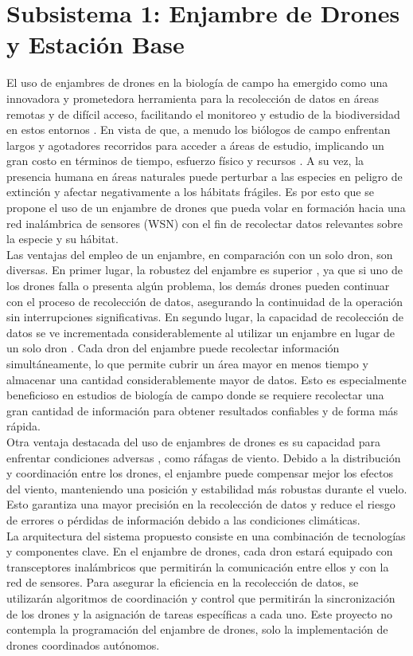 \section{Subsistema 1: Enjambre de Drones y Estación Base}
El uso de enjambres de drones en la biología de campo ha emergido como una innovadora y prometedora herramienta para la recolección de datos en áreas remotas y de difícil acceso, facilitando el monitoreo y estudio de la biodiversidad en estos entornos \cite{23}. En vista de que, a menudo los biólogos de campo enfrentan largos y agotadores recorridos para acceder a áreas de estudio, implicando un gran costo en términos de tiempo, esfuerzo físico y recursos \cite{24}. A su vez, la presencia humana en áreas naturales puede perturbar a las especies en peligro de extinción y afectar negativamente a los hábitats frágiles. Es por esto que se propone el uso de un enjambre de drones que pueda volar en formación hacia una red inalámbrica de sensores (WSN) con el fin de recolectar datos relevantes sobre la especie y su hábitat.\\
Las ventajas del empleo de un enjambre, en comparación con un solo dron, son diversas. En primer lugar, la robustez del enjambre es superior \cite{25}, ya que si uno de los drones falla o presenta algún problema, los demás drones pueden continuar con el proceso de recolección de datos, asegurando la continuidad de la operación sin interrupciones significativas. En segundo lugar, la capacidad de recolección de datos se ve incrementada considerablemente al utilizar un enjambre en lugar de un solo dron \cite{26}. Cada dron del enjambre puede recolectar información simultáneamente, lo que permite cubrir un área mayor en menos tiempo y almacenar una cantidad considerablemente mayor de datos. Esto es especialmente beneficioso en estudios de biología de campo donde se requiere recolectar una gran cantidad de información para obtener resultados confiables y de forma más rápida.\\
Otra ventaja destacada del uso de enjambres de drones es su capacidad para enfrentar condiciones adversas \cite{27}, como ráfagas de viento. Debido a la distribución y coordinación entre los drones, el enjambre puede compensar mejor los efectos del viento, manteniendo una posición y estabilidad más robustas durante el vuelo. Esto garantiza una mayor precisión en la recolección de datos y reduce el riesgo de errores o pérdidas de información debido a las condiciones climáticas.\\
La arquitectura del sistema propuesto consiste en una combinación de tecnologías y componentes clave. En el enjambre de drones, cada dron estará equipado con transceptores inalámbricos que permitirán la comunicación entre ellos y con la red de sensores. Para asegurar la eficiencia en la recolección de datos, se utilizarán algoritmos de coordinación y control que permitirán la sincronización de los drones y la asignación de tareas específicas a cada uno. Este proyecto no contempla la programación del enjambre de drones, solo la implementación de drones coordinados autónomos.\\
